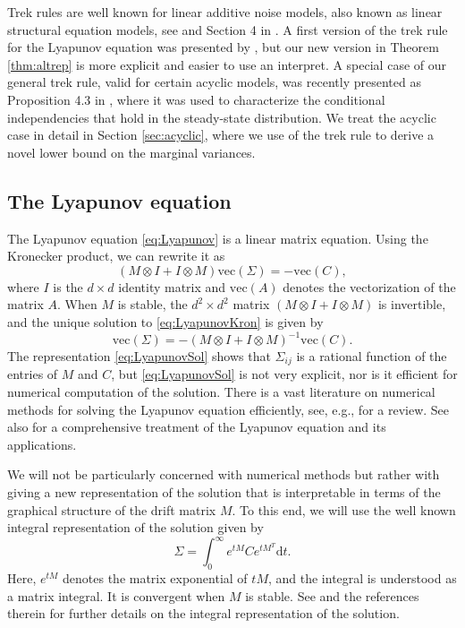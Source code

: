 \documentclass[10pt,twoside,a4paper]{amsart}
\begin{document}
 Trek rules are well known for linear additive noise models, also known as 
 linear structural equation models, see \cite{sullivant:2010} and
 Section 4 in \cite{drton2018}. A first version of the trek rule for the Lyapunov equation
 was presented by \cite{varando2020}, but our new version in Theorem \ref{thm:altrep}
 is more explicit and 
 easier to use an interpret.  A special case of our general trek rule, valid
 for certain acyclic models, was recently presented as Proposition 4.3 in
 \cite{boege2024}, where it was used to characterize the conditional
 independencies that hold in the steady-state distribution. We treat the 
 acyclic case in detail in Section \ref{sec:acyclic}, where we 
 use of the trek rule to derive a novel lower bound
 on the marginal variances. 

\subsection{The Lyapunov equation} The Lyapunov equation 
\eqref{eq:Lyapunov} is a linear matrix equation. Using the Kronecker 
product, we can rewrite it as   
\begin{equation} \label{eq:LyapunovKron}
(M \otimes I + I \otimes M)\mathrm{vec}(\Sigma) = -\mathrm{vec}(C),
\end{equation}
where $I$ is the $d \times d$ identity matrix and $\mathrm{vec}(A)$
denotes the vectorization of the matrix $A$. When $M$ is stable, 
the $d^2 \times d^2$ matrix $(M \otimes I + I \otimes M)$ is invertible, 
and the unique solution to \eqref{eq:LyapunovKron} is given by
\begin{equation} \label{eq:LyapunovSol}
\mathrm{vec}(\Sigma) = -(M \otimes I + I \otimes M)^{-1}\mathrm{vec}(C).
\end{equation}
The representation \eqref{eq:LyapunovSol}  shows 
that $\Sigma_{ij}$ is a rational function of the entries of $M$ and $C$, 
but \eqref{eq:LyapunovSol}  is not very explicit, nor is it efficient for numerical computation 
of the solution. There is a vast literature on numerical methods for 
solving the Lyapunov equation efficiently, see, e.g., \cite{Simoncini:2016} 
for a review. See also \cite{Gajic:1995} for a comprehensive treatment of the
Lyapunov equation and its applications.

We will not be particularly concerned with numerical 
methods but rather with giving a new representation of
the solution that is interpretable in terms of the graphical structure
of the drift matrix $M$. To this end, we will use the well known 
integral representation of the solution given by 
\begin{equation} \label{eq:intrep}
    \Sigma = \int_0^{\infty} e^{tM} C
    e^{tM^T} \mathrm{d} t.
\end{equation}
Here, $e^{tM}$ denotes the matrix exponential of $tM$, and the 
integral is understood as a matrix integral. It is convergent when
$M$ is stable. See \cite{varando2020} and the references therein for
further details on the integral representation of the solution.
\end{document}
